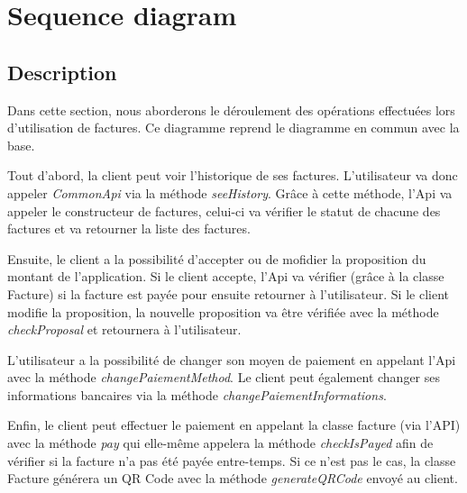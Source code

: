 \section{Sequence diagram}
\subsection{Description}

\begin{flushleft}
Dans cette section, nous aborderons le déroulement des opérations effectuées lors d'utilisation de factures. Ce diagramme reprend le diagramme en commun avec la base.
\end{flushleft}

\begin{flushleft}
Tout d'abord, la client peut voir l'historique de ses factures. L'utilisateur va donc appeler \emph{CommonApi} via la méthode \emph{seeHistory}. Grâce à cette méthode, l'Api va appeler le constructeur de factures, celui-ci va vérifier le statut de chacune des factures et va retourner la liste des factures.
\end{flushleft}

\begin{flushleft}
Ensuite, le client a la possibilité d'accepter ou de mofidier la proposition du montant de l'application. Si le client accepte, l'Api va vérifier (grâce à la classe Facture) si la facture est payée pour ensuite retourner à l'utilisateur. Si le client modifie la proposition, la nouvelle proposition va être vérifiée avec la méthode \emph{checkProposal} et retournera à l'utilisateur.
\end{flushleft}

\begin{flushleft}
L'utilisateur a la possibilité de changer son moyen de paiement en appelant l'Api avec la méthode \emph{changePaiementMethod}. Le client peut également changer ses informations bancaires via la méthode \emph{changePaiementInformations}.
\end{flushleft}

\begin{flushleft}
Enfin, le client peut effectuer le paiement en appelant la classe facture (via l'API) avec la méthode \emph{pay} qui elle-même appelera la méthode \emph{checkIsPayed} afin de vérifier si la facture n'a pas été payée entre-temps. Si ce n'est pas le cas, la classe Facture générera un QR Code avec la méthode \emph{generateQRCode} envoyé au client.
\end{flushleft}


